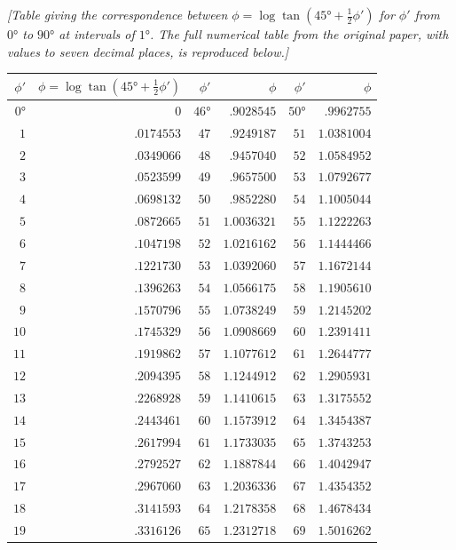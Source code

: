 \documentclass[12pt,a4paper]{article}
\theoremstyle{definition}
\begin{document}
\noindent\textit{[Table giving the correspondence between $\phi = \log\tan(45° + \tfrac{1}{2}\phi')$ for $\phi'$ from $0°$ to $90°$ at intervals of $1°$. The full numerical table from the original paper, with values to seven decimal places, is reproduced below.]}

\medskip

\begin{center}
\tiny
\begin{tabular}{r|r|r|r|r|r}
$\phi'$ & $\phi = \log\tan(45° + \tfrac{1}{2}\phi')$ & $\phi'$ & $\phi$ & $\phi'$ & $\phi$ \\
\hline
$0°$ & $0$ & $46°$ & $.9028545$ & $50°$ & $.9962755$ \\
$1$ & $.0174553$ & $47$ & $.9249187$ & $51$ & $1.0381004$ \\
$2$ & $.0349066$ & $48$ & $.9457040$ & $52$ & $1.0584952$ \\
$3$ & $.0523599$ & $49$ & $.9657500$ & $53$ & $1.0792677$ \\
$4$ & $.0698132$ & $50$ & $.9852280$ & $54$ & $1.1005044$ \\
$5$ & $.0872665$ & $51$ & $1.0036321$ & $55$ & $1.1222263$ \\
$6$ & $.1047198$ & $52$ & $1.0216162$ & $56$ & $1.1444466$ \\
$7$ & $.1221730$ & $53$ & $1.0392060$ & $57$ & $1.1672144$ \\
$8$ & $.1396263$ & $54$ & $1.0566175$ & $58$ & $1.1905610$ \\
$9$ & $.1570796$ & $55$ & $1.0738249$ & $59$ & $1.2145202$ \\
$10$ & $.1745329$ & $56$ & $1.0908669$ & $60$ & $1.2391411$ \\
$11$ & $.1919862$ & $57$ & $1.1077612$ & $61$ & $1.2644777$ \\
$12$ & $.2094395$ & $58$ & $1.1244912$ & $62$ & $1.2905931$ \\
$13$ & $.2268928$ & $59$ & $1.1410615$ & $63$ & $1.3175552$ \\
$14$ & $.2443461$ & $60$ & $1.1573912$ & $64$ & $1.3454387$ \\
$15$ & $.2617994$ & $61$ & $1.1733035$ & $65$ & $1.3743253$ \\
$16$ & $.2792527$ & $62$ & $1.1887844$ & $66$ & $1.4042947$ \\
$17$ & $.2967060$ & $63$ & $1.2036336$ & $67$ & $1.4354352$ \\
$18$ & $.3141593$ & $64$ & $1.2178358$ & $68$ & $1.4678434$ \\
$19$ & $.3316126$ & $65$ & $1.2312718$ & $69$ & $1.5016262$ \\

\end{tabular}
\end{center}
\end{document}
